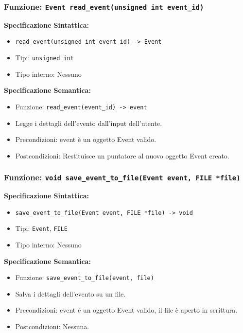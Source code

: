 \documentclass[11pt]{scrartcl} %
\begin{document}
\subsubsection{Funzione: \texttt{Event read\_event(unsigned int event\_id)}}

\textbf{Specificazione Sintattica:}
\begin{itemize}
\item \texttt{read\_event(unsigned int event\_id) -> Event}
\item Tipi: \texttt{unsigned int}
\item Tipo interno: Nessuno
\end{itemize}

\textbf{Specificazione Semantica:}
\begin{itemize}
\item Funzione: \texttt{read\_event(event\_id) -> event}
\item Legge i dettagli dell'evento dall'input dell'utente.
\item Precondizioni: event è un oggetto Event valido.
\item Postcondizioni: Restituisce un puntatore al nuovo oggetto Event creato.
\end{itemize}

\subsubsection{Funzione: \texttt{void save\_event\_to\_file(Event event, FILE *file)}}

\textbf{Specificazione Sintattica:}
\begin{itemize}
\item \texttt{save\_event\_to\_file(Event event, FILE *file) -> void}
\item Tipi: \texttt{Event}, \texttt{FILE}
\item Tipo interno: Nessuno
\end{itemize}

\textbf{Specificazione Semantica:}
\begin{itemize}
\item Funzione: \texttt{save\_event\_to\_file(event, file)}
\item Salva i dettagli dell'evento su un file.
\item Precondizioni: event è un oggetto Event valido, il file è aperto in scrittura.
\item Postcondizioni: Nessuna.
\end{itemize}
\end{document}
